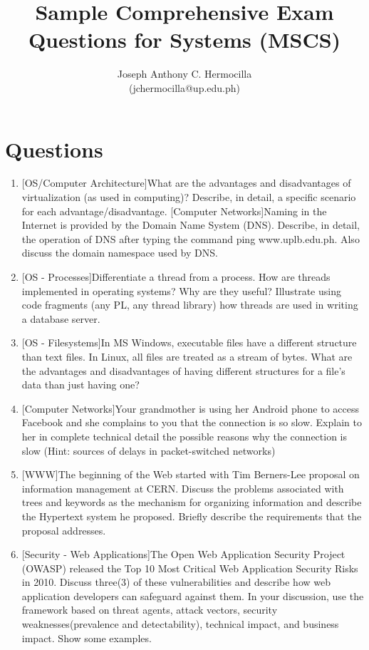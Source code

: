 \documentclass{article}
\title{Sample Comprehensive Exam Questions for Systems (MSCS)}
\author{Joseph Anthony C. Hermocilla \\ (jchermocilla@up.edu.ph)}
\begin{document}
	\maketitle

	\section*{Questions}
	\begin{enumerate}
  	\item {[OS/Computer Architecture]What are the advantages and disadvantages of virtualization (as used in computing)? Describe, in detail, a specific scenario for each advantage/disadvantage.
[Computer Networks]Naming in the Internet is provided by the Domain Name System (DNS). Describe, in detail, the operation of DNS after typing the command ping www.uplb.edu.ph. Also discuss the domain namespace used by DNS.}
  	
  	\item {[OS - Processes]Differentiate a thread from a process. How are threads implemented in operating systems? Why are they useful? Illustrate using code fragments (any PL, any thread library) how threads are used in writing a database server.}
  	
  	\item {[OS - Filesystems]In MS Windows, executable files have a different structure than text files. In Linux, all files are treated as a stream of bytes. What are the advantages and disadvantages of having different structures for a file's data than just having one?}
  	
  	\item{[Computer Networks]Your grandmother is using her Android phone to access Facebook and she complains to you that the connection is so slow. Explain to her in complete technical detail the possible reasons why the connection is slow (Hint: sources of delays in packet-switched networks)}
  	
  	\item{[WWW]The beginning of the Web started with Tim Berners-Lee proposal on information management at CERN. Discuss the problems associated with trees and keywords as the mechanism for organizing information and describe the Hypertext system he proposed. Briefly describe the requirements that the proposal addresses.}
  	
	\item {[Security - Web Applications]The Open Web Application Security Project (OWASP)  released the Top 10 Most Critical Web Application Security Risks in 2010. Discuss three(3) of these vulnerabilities and describe how web application developers can safeguard against them. In your discussion, use the framework based on threat agents,  attack vectors, security weaknesses(prevalence and detectability), technical impact, and business impact. Show some examples.} 	
  	

\end{enumerate}
\end{document}

